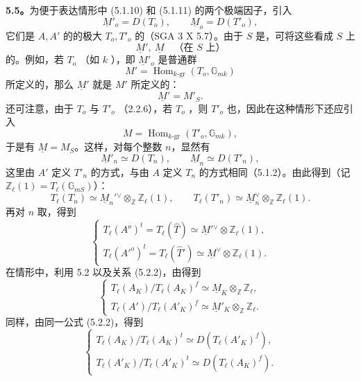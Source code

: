 \textbf{5.5。}为便于表达情形中 (5.1.10) 和 (5.1.11) 的两个极端因子，引入
\[
\underline M'_o=D(T_o),\qquad \underline M_o=D(T'_o),\tag{5.5.1}
\]
它们是 $A,A'$ 的的极大 $T_o,T'_o$ 的（SGA 3 X 5.7）。由于 $S$ 是，可将这些看成 $S$ 上
\[
\underline M',\ \underline M\quad\text{（在 $S$ 上）}\tag{5.5.2}
\]
的。例如，若 $T_o$ （如 $k$ ），即 $\underline M'_o$ 是普通群
\[
M'=\operatorname{Hom}_{k\text{-gr}}(T_o,\mathbb G_{mk})\tag{5.5.3}
\]
所定义的，那么 $\underline M'$ 就是 $M'$ 所定义的：
\[
\underline M'=M'_S.
\]
还可注意，由于 $T_o$ 与 $T'_o$ （2.2.6），若 $T_o$ ，则 $T'_o$ 也，因此在这种情形下还应引入
\[
M=\operatorname{Hom}_{k\text{-gr}}(T'_o,\mathbb G_{mk}),\tag{5.5.4}
\]
于是有 $\underline M=M_S$。这样，对每个整数 $n$，显然有
\[
\underline M'_n\simeq D(T_n),\qquad \underline M_n\simeq D(T'_n),\tag{5.5.5}
\]
这里由 $A'$ 定义 $T'_n$ 的方式，与由 $A$ 定义 $T_n$ 的方式相同（5.1.2）。由此得到（记 $\mathbb Z_\ell(1)=T_\ell(\mathbb G_{mS})$）：
\[
T_\ell(T_n)\simeq\underline M_n'{}^\vee\otimes_{\mathbb Z}\mathbb Z_\ell(1),\qquad
T_\ell(T'_n)\simeq\underline M_n^\vee\otimes_{\mathbb Z}\mathbb Z_\ell(1).\tag{5.5.6}
\]
再对 $n$ 取，得到
\[
\begin{cases}
T_\ell(A^o)^t=T_\ell(\widehat T)\simeq\underline M'{}^\vee\otimes\mathbb Z_\ell(1),\\
T_\ell(A'^o)^t=T_\ell(\widehat T')\simeq\underline M^\vee\otimes\mathbb Z_\ell(1).
\end{cases}\tag{5.5.7}
\]
在情形中，利用 5.2 以及关系 (5.2.2)，由得到
\[
\begin{cases}
T_\ell(A_K)/T_\ell(A_K)^f\simeq\underline M_K\otimes_{\mathbb Z}\mathbb Z_\ell,\\
T_\ell(A')/T_\ell(A'_K)^f\simeq\underline M'_K\otimes_{\mathbb Z}\mathbb Z_\ell.
\end{cases}\tag{5.5.8}
\]
同样，由同一公式 (5.2.2)，得到
\[
\begin{cases}
T_\ell(A_K)/T_\ell(A_K)^t\simeq D(T_\ell(A'_K)^f),\\
T_\ell(A'_K)/T_\ell(A'_K)^t\simeq D(T_\ell(A_K)^f).
\end{cases}\tag{5.5.9}
\]


